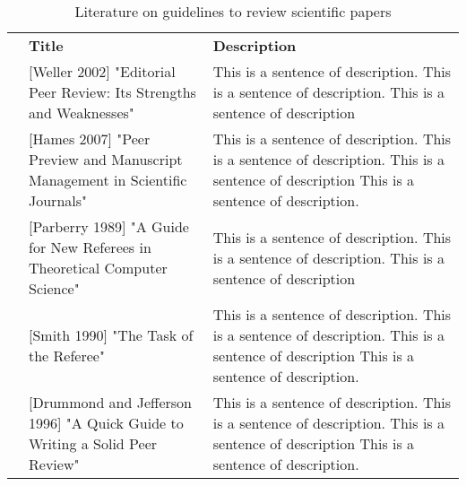 \documentclass[preview]{standalone}
\begin{document}
\begin{table} \footnotesize
	\caption{Literature on guidelines to review scientific papers}
	\newcommand{\titleWidth}{.30\textwidth}
	\newcommand{\oneRow}[3]{
		&#1 \newline #2 & #3
	}
	\newcommand{\mynewline}{\\} %
	\begin{tabularx}{\textwidth}{c|p{\titleWidth}|X|}
		\cline{2-3}
		 & \textbf{Title} & \textbf{Description}                                                                                                                                                                                                                           \\ \hhline {-==}
		\multicolumn{1}{|c||}{ \multirow{2}{*}[-15pt]{\rotatebox[origin=c]{90}{\textbf{Books}}}}
		\oneRow{[Weller 2002]}{"Editorial Peer Review: Its Strengths and Weaknesses"}{This is a sentence of description. This is a sentence of description. This is a sentence of description}                                                                             \\ \cline{2-3}
		\multicolumn{1}{|c||}{
		} \oneRow{[Hames 2007]}{"Peer Preview and Manuscript Management in Scientific Journals"}{This is a sentence of description. This is a sentence of description. This is a sentence of description This is a sentence of description.}  \mynewline \hhline{===}
		\multicolumn{1}{|c||}{ \multirow{6}{*}[-60pt]{\rotatebox[origin=c]{90}{\textbf{Journal Articles}}}}
		\oneRow{[Parberry 1989]}{"A Guide for New Referees in Theoretical Computer Science"}{This is a sentence of description. This is a sentence of description. This is a sentence of description}                                                                      \\ \cline{2-3}
		\multicolumn{1}{|c||}{} \oneRow{[Smith 1990]}{"The Task of the Referee"}{This is a sentence of description. This is a sentence of description. This is a sentence of description This is a sentence of description.}                                               \\ \cline{2-3}
		\multicolumn{1}{|c||}{} \oneRow{[Drummond and Jefferson 1996]}{"A Quick Guide to Writing a Solid Peer Review"}{This is a sentence of description. This is a sentence of description. This is a sentence of description This is a sentence of description.}         \\ \cline{2-3}

\end{tabularx}
\end{table}
\end{document}
